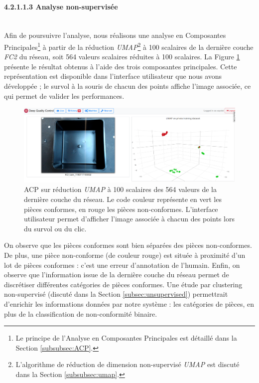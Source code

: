 \paragraph{4.2.1.1.3 Analyse non-supervisée} \mbox{} \\
Afin de poursuivre l'analyse, nous réalisons une analyse en Composantes Principales\footnote{Le principe de l'Analyse en Composantes Principales est détaillé dans la Section \ref{subsubsec:ACP}.} à partir de la réduction \textit{UMAP}\footnote{L'algorithme de réduction de dimension non-supervisé \textit{UMAP} est discuté dans la Section \ref{subsubsec:umap}.} à 100 scalaires de la dernière couche \textit{FC2} du réseau, soit 564 valeurs scalaires réduites à 100 scalaires.
La Figure \ref{fig:umap_box} présente le résultat obtenus à l'aide des trois composantes principales.
Cette représentation est disponible dans l'interface utilisateur que nous avons développée ; le survol à la souris de chacun des points affiche l'image associée, ce qui permet de valider les performances.

\begin{figure}[tbhp]
	\centering
	\includegraphics[width=\textwidth,height=\textheight,keepaspectratio]{../Chap5/Figures/Capture-2018-11-21-15-12-07.png}
	\caption{ACP sur réduction \textit{UMAP} à 100 scalaires des 564 valeurs de la dernière couche du réseau. Le code couleur représente en vert les pièces conformes, en rouge les pièces non-conformes. L'interface utilisateur permet d'afficher l'image associée à chacun des points lors du survol ou du clic.}
	\label{fig:umap_box}
\end{figure}

On observe que les pièces conformes sont bien séparées des pièces non-conformes.
De plus, une pièce non-conforme (de couleur rouge) est située à proximité d'un lot de pièces conformes : c'est une erreur d'annotation de l'humain.
Enfin, on observe que l'information issue de la dernière couche du réseau permet de discrétiser différentes catégories de pièces conformes.
Une étude par clustering non-supervisé (discuté dans la Section \ref{subsec:unsupervised}) permettrait d'enrichir les informations données par notre système : les catégories de pièces, en plus de la classification de non-conformité binaire.

